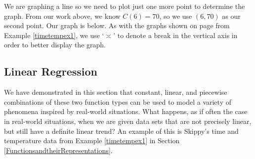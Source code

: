 \documentclass{ximera}
\begin{document}
\begin{example}
\begin{explanation}
We are graphing a line so we need to plot just one more point to determine the graph.  From our work above, we know $C(6) = 70$, so we use $(6,70)$ as our second point.   Our graph is below.   As with the graphs shown on page \pageref{firsttimewebreaktheaxis} from Example \ref{timetempex1}, we use `$\asymp$' to denote  a break in the vertical axis in order to better display the graph.

\begin{center}




\end{center}
\end{explanation}

\end{example}





 

\subsection{Linear Regression}
\label{LinearRegression}
 
We have demonstrated in this section that constant, linear, and piecewise combinations of these two function types can be used to model a variety of phenomena inspired by real-world situations.  What happens, as if often the case in real-world situations, when we are given data sets that are not precisely linear, but still have a definite linear trend?  An example of this is Skippy's  time and temperature data from Example \ref{timetempex1} in Section \ref{FunctionsandtheirRepresentations}. 
\end{document}
